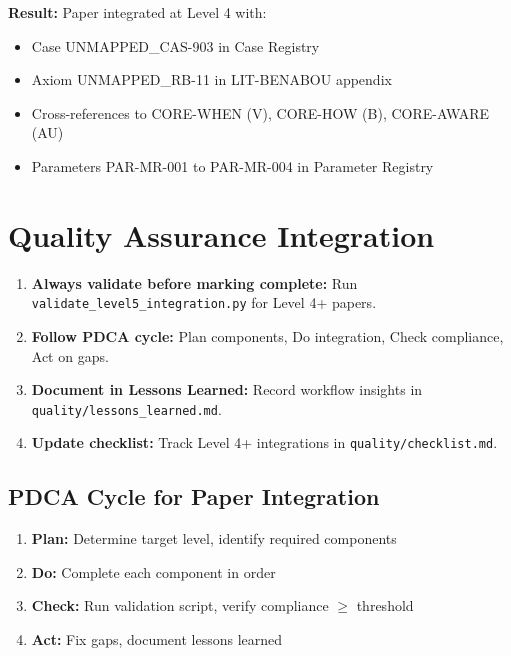 \textbf{Result:} Paper integrated at Level 4 with:
\begin{itemize}[nosep]
\item Case UNMAPPED_CAS-903 in Case Registry
\item Axiom UNMAPPED_RB-11 in LIT-BENABOU appendix
\item Cross-references to CORE-WHEN (V), CORE-HOW (B), CORE-AWARE (AU)
\item Parameters PAR-MR-001 to PAR-MR-004 in Parameter Registry
\end{itemize}


\section{Quality Assurance Integration}
\label{sec:paperint-qa}

\begin{tcolorbox}[colback=green!5!white, colframe=green!75!black,
    title=Practical Implications]
\begin{enumerate}
\item \textbf{Always validate before marking complete:} Run
      \texttt{validate\_level5\_integration.py} for Level 4+ papers.
\item \textbf{Follow PDCA cycle:} Plan components, Do integration,
      Check compliance, Act on gaps.
\item \textbf{Document in Lessons Learned:} Record workflow insights
      in \texttt{quality/lessons\_learned.md}.
\item \textbf{Update checklist:} Track Level 4+ integrations in
      \texttt{quality/checklist.md}.
\end{enumerate}
\end{tcolorbox}

\subsection{PDCA Cycle for Paper Integration}

\begin{enumerate}
\item \textbf{Plan:} Determine target level, identify required components
\item \textbf{Do:} Complete each component in order
\item \textbf{Check:} Run validation script, verify compliance $\geq$ threshold
\item \textbf{Act:} Fix gaps, document lessons learned
\end{enumerate}


